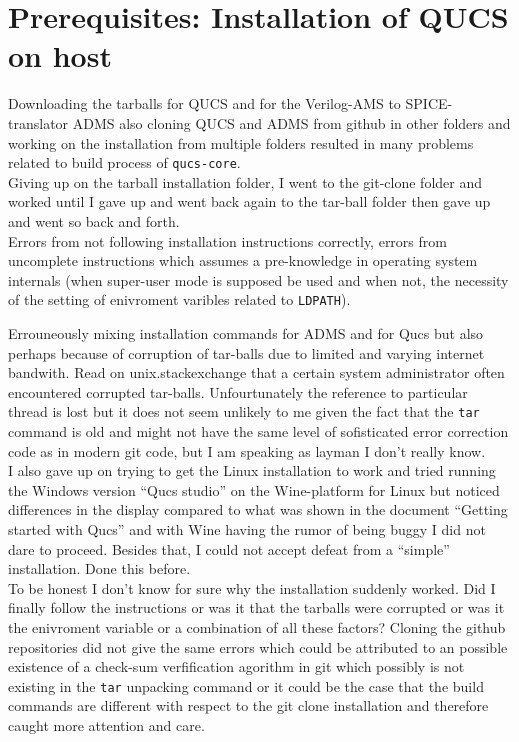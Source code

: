 \documentclass{article}
\begin{document}
\section{ Prerequisites: Installation of QUCS on host}
\begin{multicols}{2}
Downloading the tarballs for QUCS and for
the Verilog-AMS to SPICE-translator ADMS also cloning QUCS  and ADMS from github
in other folders and working on the installation from multiple folders
resulted in many problems related to build process of \verb+qucs-core+.\\

Giving up on the tarball installation folder, I went to the git-clone folder and worked until I gave up and went back again to the
tar-ball folder then gave up and went so back and forth.\\
Errors from not following installation instructions correctly,
errors from uncomplete instructions which assumes a pre-knowledge in
operating system internals (when super-user mode is supposed be used and when not,
the necessity of the setting of enivroment varibles related to \verb+LDPATH+).

Errouneously mixing installation commands for ADMS and for Qucs but also perhaps
because of corruption of tar-balls due to limited and varying internet bandwith.
Read on unix.stackexchange that a certain system administrator often encountered
corrupted tar-balls. Unfourtunately the reference to particular thread is lost but it does not
seem unlikely to me given the fact that the \verb+tar+ command is old and might not have
the same level of sofisticated error correction code as in modern git code,
but I am speaking as layman I don't really know.\\

I also gave up on trying to get the Linux installation to work and tried running the Windows version
``Qucs studio'' on the Wine-platform for Linux but noticed differences in the display compared to
 what was shown in the document ``Getting started with Qucs'' and with Wine having
 the rumor of being buggy I did not dare to proceed. Besides that, I could not
accept defeat from a ``simple'' installation. Done this before.\\

To be honest I don't know for sure why the installation suddenly
worked. Did I finally follow the instructions or was it that the tarballs were corrupted or was it the enivroment variable
or a combination of all these factors?
Cloning the github repositories
did not give the same errors which could be attributed to an possible existence of a check-sum verfification agorithm in git
which possibly is not existing in the \verb+tar+ unpacking command or it could be the case that the build commands
are different  with respect to the git clone installation and therefore caught more attention and care.\\


\end{multicols}
\end{document}
